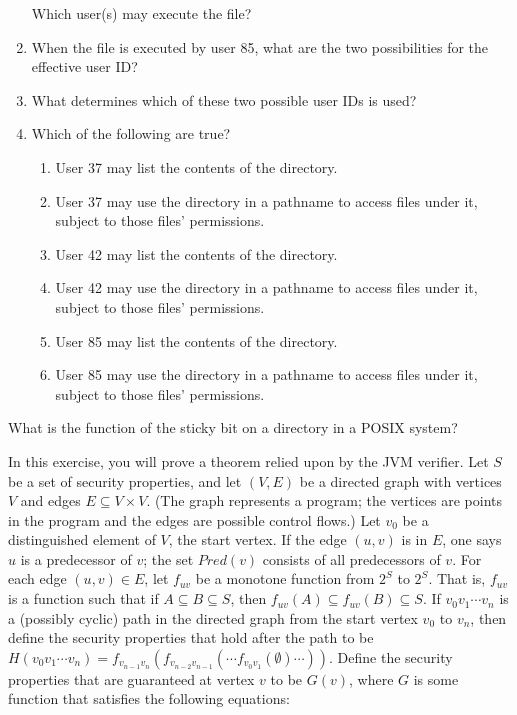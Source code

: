 \begin{chapterEnumerate}
\begin{enumerate}
Which user(s) may execute the file?
\item
When the file is executed by user 85, what are the two possibilities
for the effective user ID?
\item
What determines which of these two possible user IDs is used?
\item
Which of the following are true?
\begin{enumerate}
\item
User 37 may list the contents of the directory.
\item
User 37 may use the directory in a pathname to access files under it,
subject to those files' permissions.
\item
User 42 may list the contents of the directory.
\item
User 42 may use the directory in a pathname to access files under it,
subject to those files' permissions.
\item
User 85 may list the contents of the directory.
\item
User 85 may use the directory in a pathname to access files under it,
subject to those files' permissions.
\end{enumerate}
\end{enumerate}
\item
What is the function of the sticky bit on a directory in a POSIX system?
\item\label{jvm-verifier-exercise}
In this exercise, you will prove a theorem relied upon by the JVM
verifier.  Let $S$ be a set of security properties, and let $(V,E)$ be a
directed graph with vertices $V$ and edges $E \subseteq V \times V$.
(The graph represents a program; the vertices are points in the
program and the edges are possible control flows.)  Let $v_0$ be a
distinguished element of $V$, the start vertex.  If the edge $(u,v)$
is in $E$, one says $u$ is a predecessor of $v$; the set $Pred(v)$
consists of all predecessors of $v$.  For each edge $(u,v) \in E$, let
$f_{uv}$ be a monotone function from $2^S$ to $2^S$.  That is,
$f_{uv}$ is a function such that if $A \subseteq B \subseteq S$, then
$f_{uv}(A) \subseteq f_{uv}(B) \subseteq S$.  If $v_0v_1\cdots v_n$ is
a (possibly cyclic) path in the directed graph from the start vertex $v_0$
to $v_n$, then define the security properties that hold after
the path to be $H(v_0v_1\cdots v_n) =
f_{v_{n-1}v_n}(f_{v_{n-2}v_{n-1}}(\cdots
f_{v_0v_1}(\emptyset)\cdots))$.  Define the security properties that
are guaranteed at vertex $v$ to be $G(v)$, where $G$ is some function
that satisfies the following equations:

\end{chapterEnumerate}
